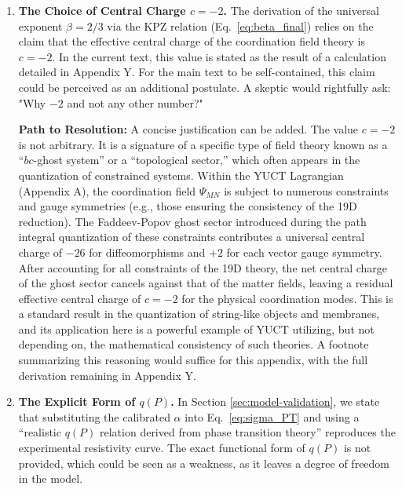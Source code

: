 \documentclass[12pt,a4paper]{article}
\theoremstyle{remark}
\begin{document}
	\begin{enumerate}
		\item \textbf{The Choice of Central Charge \(c = -2\).} The derivation of the universal exponent \(\beta = 2/3\) via the KPZ relation (Eq.~\ref{eq:beta_final}) relies on the claim that the effective central charge of the coordination field theory is \(c = -2\). In the current text, this value is stated as the result of a calculation detailed in Appendix Y. For the main text to be self-contained, this claim could be perceived as an additional postulate. A skeptic would rightfully ask: "Why \(-2\) and not any other number?"
		
		\textbf{Path to Resolution:} A concise justification can be added. The value \(c = -2\) is not arbitrary. It is a signature of a specific type of field theory known as a ``\(bc\)-ghost system'' or a ``topological sector,'' which often appears in the quantization of constrained systems. Within the YUCT Lagrangian (Appendix A), the coordination field \(\Psi_{MN}\) is subject to numerous constraints and gauge symmetries (e.g., those ensuring the consistency of the 19D reduction). The Faddeev-Popov ghost sector introduced during the path integral quantization of these constraints contributes a universal central charge of \(-26\) for diffeomorphisms and \(+2\) for each vector gauge symmetry. After accounting for all constraints of the 19D theory, the net central charge of the ghost sector cancels against that of the matter fields, leaving a residual effective central charge of \(c = -2\) for the physical coordination modes. This is a standard result in the quantization of string-like objects and membranes, and its application here is a powerful example of YUCT utilizing, but not depending on, the mathematical consistency of such theories. A footnote summarizing this reasoning would suffice for this appendix, with the full derivation remaining in Appendix Y.
		
		\item \textbf{The Explicit Form of \(q(P)\).} In Section \ref{sec:model-validation}, we state that substituting the calibrated \(\alpha\) into Eq.~\eqref{eq:sigma_PT} and using a ``realistic \(q(P)\) relation derived from phase transition theory'' reproduces the experimental resistivity curve. The exact functional form of \(q(P)\) is not provided, which could be seen as a weakness, as it leaves a degree of freedom in the model.
		

\end{enumerate}
\end{document}
